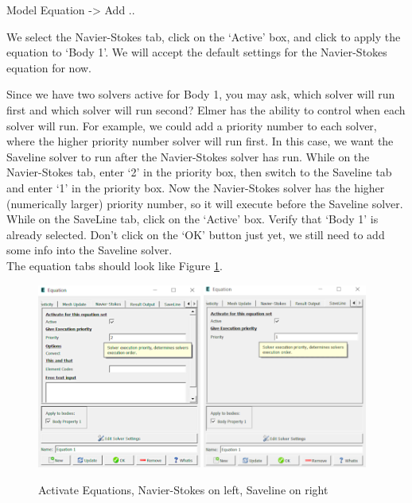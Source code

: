 \ttbegin
Model
  Equation -> Add ..
\ttend  

We select the Navier-Stokes tab, click on the `Active' box, and click to apply the equation to `Body 1'.
We will accept the default settings for the Navier-Stokes equation for now.

Since we have two solvers active for Body 1, you may ask, which solver will run first and which solver
will run second?  Elmer has the ability to control when each solver will run.  For example, we could add
a priority number to each solver, where the higher priority number solver will run first.  In this case,
we want the Saveline solver to run after the Navier-Stokes solver has run.  While on the Navier-Stokes
tab, enter `2' in the priority box, then switch to the Saveline tab and enter `1' in the priority box.  Now the Navier-Stokes solver has the higher (numerically larger) priority number, so it will execute before the Saveline solver.\\

While on the SaveLine tab, click on the `Active' box.  Verify that `Body 1' is already selected.  Don't click
on the `OK' button just yet, we still need to add some info into the Saveline solver.\\

The equation tabs should look like Figure \ref{fg:DC_equation}. 

\begin{figure}[H]
\centering
\includegraphics[width=0.48\textwidth]{DC_equation}
\includegraphics[width=0.48\textwidth]{DC_equation2}
\caption{Activate Equations, Navier-Stokes on left, Saveline on right}\label{fg:DC_equation}
\end{figure}

